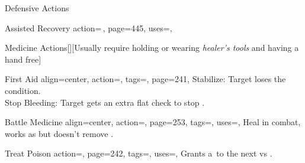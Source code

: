 \begin{PageBack}
\begin{Tables}{\backTableHeight}
\begin{Table}{Defensive Actions}
\begin{entry}{Assisted Recovery}{%
                action={\,\sffamily{}},
                page=445,
                uses=,
            }
                 \hfill
            \end{entry}
        \end{Table}
        \TableSpace
        \begin{Table}{Medicine Actions}[][\quad Usually require holding or wearing \textit{healer's tools} and having
        a hand
        free]
            \begin{entry}{First Aid}{%
                align=center,
                action=,
                tags=\Manipulate,
                page=241,
            }%
                \setlength{\tabcolsep}{9pt}%
                \Medicine[][before=Recovery,val=+5]\edash Stabilize:
                Target loses the \Dying condition. \hfill
                \\
                \Medicine[][before=Effect] \hspace{0.2ex}\edash\hspace{0.2ex}Stop Bleeding:
                Target gets an extra \DC[10] flat check to stop \Bleeding.\hfill
            \end{entry}
            \begin{entry}{Battle Medicine}{%
                align=center,
                action=,
                page=253,
                tags=\Manipulate,
                uses=\Medicine\Feat,
            }
                Heal in combat, works as  but doesn't remove \Wounded.\hfill
                \\\hfill
                \T\DC[15] \quad\quad
                \E\DC[20] \quad\quad
                \M\DC[30]  \quad\quad
                \Le\DC[40] \hfill {}
            \end{entry}
            \begin{entry}{Treat Poison}{%
                action=,
                page=242,
                tags=\Manipulate,
                uses={\Medicine[tags={T}]},
            }
                Grants a \,\Cirm to the next  vs .\hfill
            \end{entry}
        \end{Table}

\end{Tables}
\end{PageBack}
